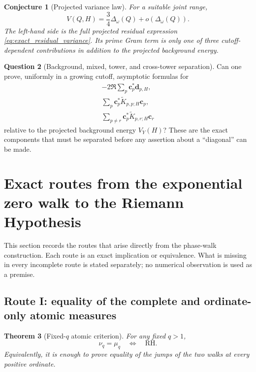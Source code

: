 \documentclass[11pt]{amsart}
\numberwithin{equation}{section}
\theoremstyle{plain}
\newtheorem{theorem}{Theorem}[section]
\newtheorem{conjecture}[theorem]{Conjecture}
\theoremstyle{definition}
\newtheorem{question}[theorem]{Question}
\theoremstyle{remark}
\newcommand{\RH}{\mathrm{RH}}
\newcommand{\1}{\mathbf{1}}
\begin{document}
\begin{conjecture}[Projected variance law]
\label{conj:projected_variance_law}
For a suitable joint range,
\begin{equation}
V(Q,H)
=
\frac34\Delta_\omega(Q)
+
o\left(\Delta_\omega(Q)\right).
\label{eq:projected_variance_law}
\end{equation}
The left-hand side is the full projected residual expression
\eqref{eq:exact_residual_variance}.  Its prime Gram term is only one of
three cutoff-dependent contributions in addition to the projected
background energy.
\end{conjecture}

\begin{question}[Background, mixed, tower, and cross-tower separation]
\label{question:tower_cross_tower_separation}
Can one prove, uniformly in a growing cutoff, asymptotic formulas for
\begin{align}
-2\Re\sum_p\mathbf c_p^\ast\mathbf d_{p,H},
\label{eq:mixed_sum_target}
\\
\sum_p\mathbf c_p^\ast\widetilde K_{p,p;H}\mathbf c_p,
\label{eq:tower_sum_target}
\\
\sum_{p\neq r}\mathbf c_p^\ast\widetilde K_{p,r;H}\mathbf c_r
\label{eq:cross_tower_sum_target}
\end{align}
relative to the projected background energy $V_Y(H)$?  These are the exact
components that must be separated before any assertion about a
``diagonal'' can be made.
\end{question}




\section{Exact routes from the exponential zero walk to the Riemann Hypothesis}
\label{sec:routes_to_RH}

This section records the routes that arise directly from the phase-walk
construction.  Each route is an exact implication or equivalence.  What is
missing in every incomplete route is stated separately; no numerical
observation is used as a premise.

\subsection{Route I: equality of the complete and ordinate-only atomic measures}
\label{subsec:route_atomic_equality}

\begin{theorem}[Fixed-\(q\) atomic criterion]
\label{thm:route_fixed_q_atomic}
For any fixed \(q>1\),
\begin{equation}
\nu_q=\mu_q
\quad\Longleftrightarrow\quad
\RH.
\label{eq:route_fixed_q_atomic}
\end{equation}
Equivalently, it is enough to prove equality of the jumps of the two walks
at every positive ordinate.
\end{theorem}
\end{document}
